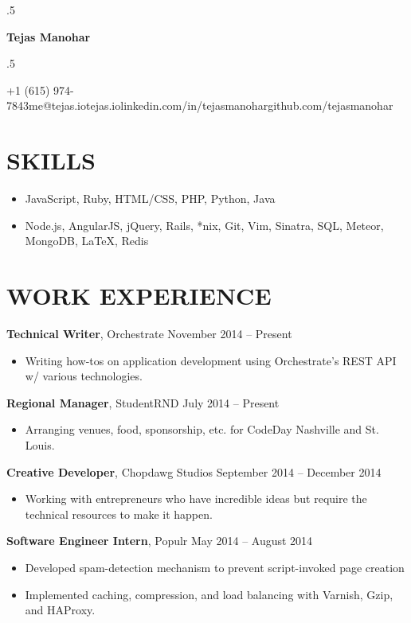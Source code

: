 \documentclass{res}
\newcommand*{\its}{\hspace{0.8cm}}
\begin{document}
\moveleft.5\hoffset\centerline{\Huge\bf Tejas Manohar}
\bigskip
\moveleft.5\hoffset\centerline{+1 (615) 974-7843\its{}me@tejas.io\its{}\its{}tejas.io\its{}linkedin.com/in/tejasmanohar\its{}github.com/tejasmanohar}

\section{SKILLS}

\begin{itemize} \itemsep -2pt
  \item JavaScript, Ruby, HTML/CSS, PHP, Python, Java
  \item Node.js, AngularJS, jQuery, Rails, *nix, Git, Vim, Sinatra, SQL, Meteor, MongoDB, \LaTeX, Redis
\end{itemize}

\section{WORK EXPERIENCE}

{\bf Technical Writer}, Orchestrate \hfill November 2014 -- Present
\begin{itemize} \itemsep -2pt
  \item Writing how-tos on application development using Orchestrate's REST API w/ various technologies.
\end{itemize}

{\bf Regional Manager}, StudentRND \hfill July 2014 -- Present
\begin{itemize} \itemsep -2pt
  \item Arranging venues, food, sponsorship, etc. for CodeDay Nashville and St. Louis.
\end{itemize}

{\bf Creative Developer}, Chopdawg Studios \hfill September 2014 -- December 2014
\begin{itemize} \itemsep -2pt
  \item Working with entrepreneurs who have incredible ideas but require the technical resources to make it happen.
\end{itemize}

{\bf Software Engineer Intern}, Populr \hfill May 2014 -- August 2014
\begin{itemize} \itemsep -2pt
  \item Developed spam-detection mechanism to prevent script-invoked page creation
  \item Implemented caching, compression, and load balancing with Varnish, Gzip, and HAProxy.
\end{itemize}
\end{document}
